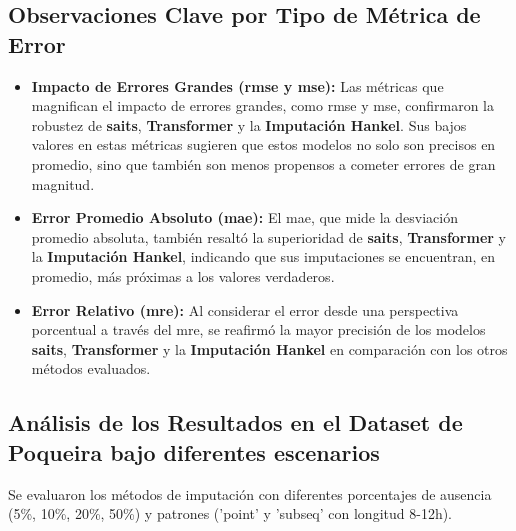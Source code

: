 \subsection*{Observaciones Clave por Tipo de Métrica de Error}
\begin{itemize}
    \item \textbf{Impacto de Errores Grandes (\gls{rmse} y \gls{mse}):} Las métricas que magnifican el impacto de errores grandes, como \gls{rmse} y \gls{mse}, confirmaron la robustez de \textbf{\gls{saits}}, \textbf{Transformer} y la \textbf{Imputación Hankel}. Sus bajos valores en estas métricas sugieren que estos modelos no solo son precisos en promedio, sino que también son menos propensos a cometer errores de gran magnitud.
    \item \textbf{Error Promedio Absoluto (\gls{mae}):} El \gls{mae}, que mide la desviación promedio absoluta, también resaltó la superioridad de \textbf{\gls{saits}}, \textbf{Transformer} y la \textbf{Imputación Hankel}, indicando que sus imputaciones se encuentran, en promedio, más próximas a los valores verdaderos.
    \item \textbf{Error Relativo (\gls{mre}):} Al considerar el error desde una perspectiva porcentual a través del \gls{mre}, se reafirmó la mayor precisión de los modelos \textbf{\gls{saits}}, \textbf{Transformer} y la \textbf{Imputación Hankel} en comparación con los otros métodos evaluados.
\end{itemize}

\subsection*{Análisis de los Resultados en el Dataset de Poqueira bajo diferentes escenarios}
Se evaluaron los métodos de imputación con diferentes porcentajes de ausencia (5\%, 10\%, 20\%, 50\%) y patrones ('point' y 'subseq' con longitud 8-12h).

